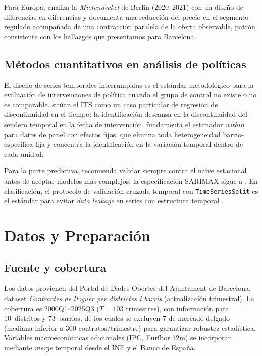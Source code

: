 \documentclass[10pt,a4paper,twocolumn]{article}
\begin{document}
Para Europa, \citet{kholodilin2021rent} analiza la \textit{Mietendeckel} de Berlín
(2020--2021) con un diseño de diferencias en diferencias y documenta una reducción del
precio en el segmento regulado acompañada de una contracción paralela de la oferta
observable, patrón consistente con los hallazgos que presentamos para Barcelona.

\subsection{Métodos cuantitativos en análisis de políticas}

El diseño de series temporales interrumpidas \citep{wagner2002its} es el estándar
metodológico para la evaluación de intervenciones de política cuando el grupo de
control no existe o no es comparable. \citet{angrist2009mostly} sitúan el ITS como
un caso particular de regresión de discontinuidad en el tiempo: la identificación
descansa en la discontinuidad del sendero temporal en la fecha de intervención.
\citet{baltagi2021econometric} fundamenta el estimador \textit{within} para datos de
panel con efectos fijos, que elimina toda heterogeneidad barrio-específica fija y
concentra la identificación en la variación temporal dentro de cada unidad.

Para la parte predictiva, \citet{hyndman2021forecasting} recomienda validar siempre
contra el naïve estacional antes de aceptar modelos más complejos; la especificación
SARIMAX sigue a \citet{box2015timeseries}. En clasificación, el protocolo de
validación cruzada temporal con \texttt{TimeSeriesSplit} es el estándar para evitar
\textit{data leakage} en series con estructura temporal \citep{bergmeir2018note}.

\section{Datos y Preparación}
\label{sec:datos}

\subsection{Fuente y cobertura}

Los datos provienen del Portal de Dades Obertes del Ajuntament de Barcelona, dataset
\textit{Contractes de lloguer per districtes i barris} (actualización trimestral).
La cobertura es 2000Q1--2025Q3 ($T{=}103$ trimestres), con información para
10~distritos y 73~barrios, de los cuales se excluyen 7 de mercado delgado (mediana
inferior a 300 contratos/trimestre) para garantizar robustez estadística. Variables
macroeconómicas adicionales (IPC, Euríbor 12m) se incorporan mediante \textit{merge}
temporal desde el INE y el Banco de España.
\end{document}
